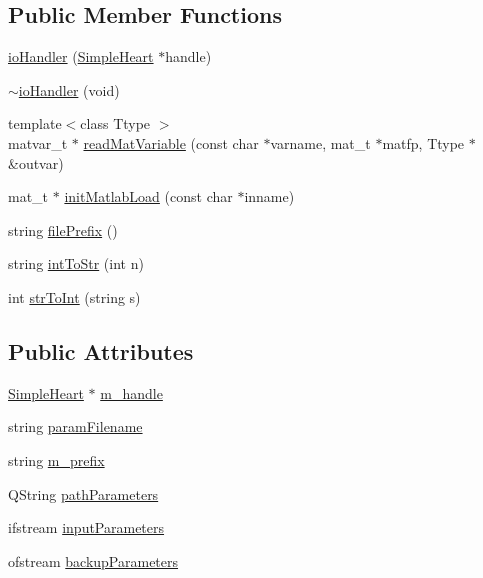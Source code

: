 \subsection*{Public Member Functions}
\begin{DoxyCompactItemize}
\item 
\hyperlink{classio_handler_aa57cd18c3ae379dbc508d2942ee553fa}{io\+Handler} (\hyperlink{class_simple_heart}{Simple\+Heart} $\ast$handle)
\item 
\hyperlink{classio_handler_a030878327dcdc71c410e2b3184538aed}{$\sim$io\+Handler} (void)
\item 
{\footnotesize template$<$class Ttype $>$ }\\matvar\+\_\+t $\ast$ \hyperlink{classio_handler_a217721cec0dfbacc3b564bfaa4cc7b8b}{read\+Mat\+Variable} (const char $\ast$varname, mat\+\_\+t $\ast$matfp, Ttype $\ast$\&outvar)
\item 
mat\+\_\+t $\ast$ \hyperlink{classio_handler_a98fa0fabd78d5c31b4949806ac40400d}{init\+Matlab\+Load} (const char $\ast$inname)
\item 
string \hyperlink{classio_handler_aaf8038bd0ff5a184504cf4622411fd51}{file\+Prefix} ()
\item 
string \hyperlink{classio_handler_a7d65ecb912b15cbeff8ecaa3f3a33f7b}{int\+To\+Str} (int n)
\item 
int \hyperlink{classio_handler_a24088c5418729764793ad2ff055d4de8}{str\+To\+Int} (string s)
\end{DoxyCompactItemize}
\subsection*{Public Attributes}
\begin{DoxyCompactItemize}
\item 
\hyperlink{class_simple_heart}{Simple\+Heart} $\ast$ \hyperlink{classio_handler_a69a16636ea31e6b2c16a447cc69c9d40}{m\+\_\+handle}
\item 
string \hyperlink{classio_handler_aa997341357b4da444f481ab43f455f9b}{param\+Filename}
\item 
string \hyperlink{classio_handler_a80e45be220c886422df536b4714e4b94}{m\+\_\+prefix}
\item 
Q\+String \hyperlink{classio_handler_a18b3ace510b075e81a08a4a3ed9d00a2}{path\+Parameters}
\item 
ifstream \hyperlink{classio_handler_a9eb908a81637ccd23846b8722f89a3c3}{input\+Parameters}
\item 
ofstream \hyperlink{classio_handler_a3dde6edac5ac86c95b1651faafd8b418}{backup\+Parameters}
\end{DoxyCompactItemize}



